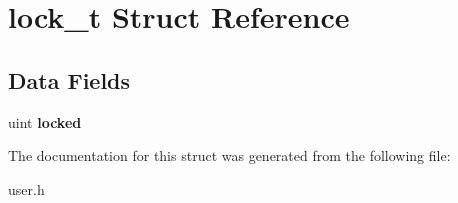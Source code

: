 \hypertarget{structlock__t}{}\section{lock\+\_\+t Struct Reference}
\label{structlock__t}
\subsection*{Data Fields}
\begin{DoxyCompactItemize}
\item 
uint {\bfseries locked}\hypertarget{structlock__t_aabb79a73ec1857343f98026d1e2f0ad8}{}\label{structlock__t_aabb79a73ec1857343f98026d1e2f0ad8}

\end{DoxyCompactItemize}


The documentation for this struct was generated from the following file\+:\begin{DoxyCompactItemize}
\item 
user.\+h\end{DoxyCompactItemize}
